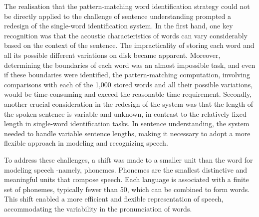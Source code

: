 

The realisation that the pattern-matching word identification strategy could not be directly applied to the challenge of sentence understanding prompted a redesign of the single-word identification system. In the first hand, one key recognition was that the acoustic characteristics of words can vary considerably based on the context of the sentence. The impracticality of storing each word and all its possible different variations on disk became apparent. Moreover, determining the boundaries of each word  was an almost impossible task, and even if these boundaries were identified, the pattern-matching computation, involving comparisons with each of the 1,000 stored words and all their possible variations, would be time-consuming and exceed the reasonable time requirement. Secondly, another crucial consideration in the redesign of the system was that the length of the spoken sentence is variable and unknown, in contrast to the relatively fixed length in single-word identification tasks. In sentence understanding, the system needed to handle variable sentence lengths, making it necessary to adopt a more flexible approach in modeling and recognizing speech.

To address these challenges, a shift was made to a smaller unit than the word for modeling speech -namely, phonemes. Phonemes are the smallest distinctive and meaningful units that compose speech. Each language is associated with a finite set of phonemes, typically fewer than 50, which can be combined to form words. This shift enabled a more efficient and flexible representation of speech, accommodating the variability in the pronunciation of words.


